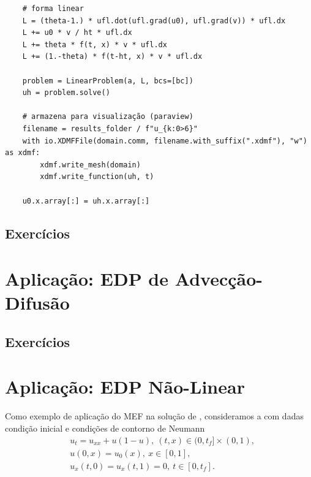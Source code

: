 \begin{ex}
\begin{lstlisting}
    # forma linear
    L = (theta-1.) * ufl.dot(ufl.grad(u0), ufl.grad(v)) * ufl.dx
    L += u0 * v / ht * ufl.dx
    L += theta * f(t, x) * v * ufl.dx
    L += (1.-theta) * f(t-ht, x) * v * ufl.dx

    problem = LinearProblem(a, L, bcs=[bc])
    uh = problem.solve()

    # armazena para visualização (paraview)
    filename = results_folder / f"u_{k:0>6}"
    with io.XDMFFile(domain.comm, filename.with_suffix(".xdmf"), "w") as xdmf:
        xdmf.write_mesh(domain)
        xdmf.write_function(uh, t)

    u0.x.array[:] = uh.x.array[:]  
\end{lstlisting}
\end{ex}


\subsection{Exercícios}
\badgeConstrucao

\section{Aplicação: EDP de Advecção-Difusão}\label{cap_mef1d_sec_eqad}
\badgeConstrucao

\subsection{Exercícios}
\badgeConstrucao


\section{Aplicação: EDP Não-Linear}\label{cap_mef1d_sec_eqnl}
\badgeConstrucao

Como exemplo de aplicação do MEF na solução de , consideramos a  com dadas condição inicial e condições de contorno de Neumann{\neumann}
\begin{subequations}\label{cap_mef1d_sec_eqnl:eq:prob}
  \begin{align}
    &u_t = u_{xx} + u(1-u), ~(t,x)\in (0,t_f]\times (0,1),\\
    &u(0, x) = u_0(x), ~x\in [0,1],\\
    &u_x(t,0) = u_x(t,1) = 0, ~t\in [0,t_f].
  \end{align}
\end{subequations}

